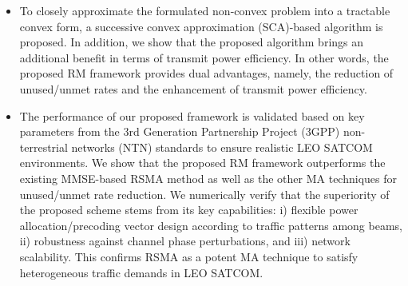 \documentclass[draftclsnofoot, onecolumn, comsoc, 12pt]{IEEEtran}
\begin{document}
\begin{itemize}
\item To closely approximate the formulated non-convex problem into a tractable convex form, a successive convex approximation (SCA)-based algorithm is proposed.
In addition, we show that the proposed algorithm brings an additional benefit in terms of transmit power efficiency.
In other words, the proposed RM framework provides dual advantages, namely, the reduction of unused/unmet rates and the enhancement of transmit power efficiency.
\item 
{The performance of our proposed framework is validated based on key parameters from the 3rd Generation Partnership Project (3GPP) non-terrestrial networks (NTN) standards \cite{3gpp_ntn} to ensure realistic LEO SATCOM environments.} We show that the proposed RM framework outperforms the existing MMSE-based RSMA method \cite{cui2023energy} as well as the other MA techniques for {unused}/{unmet rate} reduction.
We numerically verify that the superiority of the proposed scheme stems from its key capabilities: i) flexible power allocation/precoding vector design according to traffic patterns among beams, ii) robustness against channel phase perturbations, and iii) network scalability. {This confirms RSMA as a potent MA technique to satisfy heterogeneous traffic demands in LEO SATCOM.}

\end{itemize}
\end{document}
